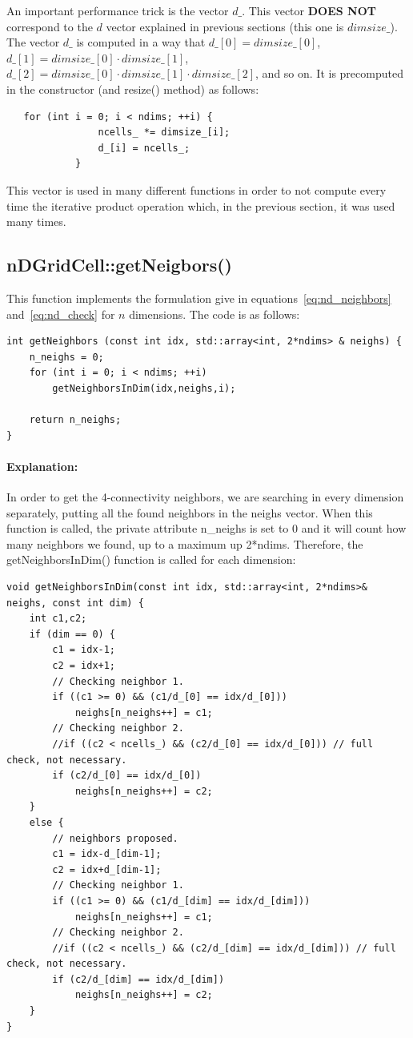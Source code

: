 \documentclass[12pt]{article}
\begin{document}
An important performance trick is the vector $d\_$. This vector \textbf{DOES NOT} correspond to the $d$ vector explained in previous sections (this one is $dimsize\_$). The vector $d\_$ is computed in a way that $d\_[0] = dimsize\_[0]$,  $d\_[1] = dimsize\_[0]\cdot dimsize\_[1]$, $d\_[2] = dimsize\_[0]\cdot dimsize\_[1]\cdot dimsize\_[2]$, and so on. It is precomputed in the constructor (and resize() method) as follows:

\begin{lstlisting}
   for (int i = 0; i < ndims; ++i) {
				ncells_ *= dimsize_[i];
				d_[i] = ncells_;
			}
\end{lstlisting}

This vector is used in many different functions in order to not compute every time the iterative product operation which, in the previous section, it was used many times.

\subsection{nDGridCell::getNeigbors()}
This function implements the formulation give in equations~\ref{eq:nd_neighbors} and~\ref{eq:nd_check} for $n$ dimensions. The code is as follows:

\begin{lstlisting}
int getNeighbors (const int idx, std::array<int, 2*ndims> & neighs) {
	n_neighs = 0;
	for (int i = 0; i < ndims; ++i)
		getNeighborsInDim(idx,neighs,i);

	return n_neighs;
}
\end{lstlisting}

\paragraph{Explanation:} In order to get the 4-connectivity neighbors, we are searching in every dimension separately, putting all the found neighbors in the neighs vector. When this function is called, the private attribute n\_neighs is set to 0 and it will count how many neighbors we found, up to a maximum up 2*ndims. Therefore, the getNeighborsInDim() function is called for each dimension:

\begin{lstlisting}
void getNeighborsInDim(const int idx, std::array<int, 2*ndims>& neighs, const int dim) {
	int c1,c2;
	if (dim == 0) {
		c1 = idx-1;
		c2 = idx+1;
		// Checking neighbor 1.
		if ((c1 >= 0) && (c1/d_[0] == idx/d_[0]))
			neighs[n_neighs++] = c1;
		// Checking neighbor 2.
		//if ((c2 < ncells_) && (c2/d_[0] == idx/d_[0])) // full check, not necessary.
		if (c2/d_[0] == idx/d_[0])
			neighs[n_neighs++] = c2;
	}
	else {
		// neighbors proposed.
		c1 = idx-d_[dim-1];
		c2 = idx+d_[dim-1];
		// Checking neighbor 1.
		if ((c1 >= 0) && (c1/d_[dim] == idx/d_[dim]))
			neighs[n_neighs++] = c1;
		// Checking neighbor 2.
		//if ((c2 < ncells_) && (c2/d_[dim] == idx/d_[dim])) // full check, not necessary.
		if (c2/d_[dim] == idx/d_[dim])
			neighs[n_neighs++] = c2;
	}
}

\end{lstlisting}
\end{document}
